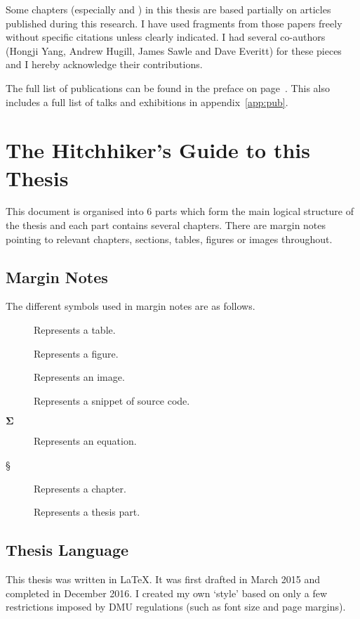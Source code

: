 Some chapters (especially  and ) in this thesis are based partially on articles published during this research. I have used fragments from those papers freely without specific citations unless clearly indicated. I had several co-authors (Hongji Yang, Andrew Hugill, James Sawle and Dave Everitt) for these pieces and I hereby acknowledge their contributions.

The full list of publications can be found in the preface on page~\pageref{pre:pub}. This also includes a full list of talks and exhibitions in appendix~\ref{app:pub}.


\section{The Hitchhiker's Guide to this Thesis}

This document is organised into \num{6} parts which form the main logical structure of the thesis and each part contains several chapters. There are margin notes pointing to relevant chapters, sections, tables, figures or images throughout.


\subsection{Margin Notes}

The different symbols used in margin notes are as follows.

\begin{description}
  \item [] Represents a table.
  \item [] Represents a figure.
  \item [] Represents an image.
  \item [] Represents a snippet of source code.
  \item [$\bm{\Sigma}$] Represents an equation.
  \item [§] Represents a chapter.
  \item [\textspiral] Represents a thesis part.
\end{description}


\subsection{Thesis Language}

This thesis was written in \LaTeX. It was first drafted in March 2015 and completed in December 2016. I created my own `style' based on only a few restrictions imposed by \ac{DMU} regulations (such as font size and page margins).


